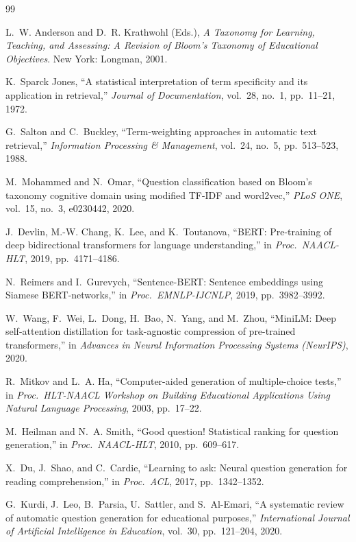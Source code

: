 \renewcommand{\bibname}{References}
\begin{thebibliography}{99}
\setlength{\itemsep}{2pt}
\small

 L.~W. Anderson and D.~R. Krathwohl (Eds.), \emph{A Taxonomy for Learning, Teaching, and
Assessing: A Revision of Bloom's Taxonomy of Educational Objectives}. New York: Longman, 2001.

 K.~Sparck Jones, ``A statistical interpretation of term specificity and its application in
retrieval,'' \emph{Journal of Documentation}, vol.~28, no.~1, pp.~11--21, 1972.

 G.~Salton and C.~Buckley, ``Term-weighting approaches in automatic text retrieval,''
\emph{Information Processing \& Management}, vol.~24, no.~5, pp.~513--523, 1988.

 M.~Mohammed and N.~Omar, ``Question classification based on Bloom's taxonomy cognitive domain
using modified TF-IDF and word2vec,'' \emph{PLoS ONE}, vol.~15, no.~3, e0230442, 2020.

 J.~Devlin, M.-W. Chang, K.~Lee, and K.~Toutanova, ``BERT: Pre-training of deep bidirectional
transformers for language understanding,'' in \emph{Proc.\ NAACL-HLT}, 2019, pp.~4171--4186.

 N.~Reimers and I.~Gurevych, ``Sentence-BERT: Sentence embeddings using Siamese BERT-networks,''
in \emph{Proc.\ EMNLP-IJCNLP}, 2019, pp.~3982--3992.

 W.~Wang, F.~Wei, L.~Dong, H.~Bao, N.~Yang, and M.~Zhou, ``MiniLM: Deep self-attention
distillation for task-agnostic compression of pre-trained transformers,'' in \emph{Advances in Neural Information
Processing Systems (NeurIPS)}, 2020.

 R.~Mitkov and L.~A. Ha, ``Computer-aided generation of multiple-choice tests,'' in \emph{Proc.\
HLT-NAACL Workshop on Building Educational Applications Using Natural Language Processing}, 2003, pp.~17--22.

 M.~Heilman and N.~A. Smith, ``Good question! Statistical ranking for question generation,'' in
\emph{Proc.\ NAACL-HLT}, 2010, pp.~609--617.

 X.~Du, J.~Shao, and C.~Cardie, ``Learning to ask: Neural question generation for reading
comprehension,'' in \emph{Proc.\ ACL}, 2017, pp.~1342--1352.

 G.~Kurdi, J.~Leo, B.~Parsia, U.~Sattler, and S.~Al-Emari, ``A systematic review of automatic
question generation for educational purposes,'' \emph{International Journal of Artificial Intelligence in Education},
vol.~30, pp.~121--204, 2020.


\end{thebibliography}
